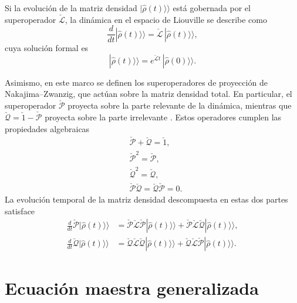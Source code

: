 Si la evolución de la matriz densidad $|\hat{\rho}(t)\rangle \rangle$ está gobernada por el superoperador $\check{\mathcal{L}}$, la dinámica en el espacio de Liouville se describe como
\begin{equation*}
    \frac{d}{dt}|\hat{\rho}(t) \rangle \rangle = \check{\mathcal{L}}\,|\hat{\rho}(t) \rangle \rangle,
\end{equation*}
cuya solución formal es
\begin{equation}
    |\hat{\rho}(t)\rangle \rangle = e^{\check{\mathcal{L}}t}\,|\hat{\rho}(0)\rangle \rangle. 
    \label{sec2liouvilleformal}
\end{equation}

Asimismo, en este marco se definen los superoperadores de proyección de Nakajima–Zwanzig, que actúan sobre la matriz densidad total. En particular, el superoperador $\check{\mathcal{P}}$ proyecta sobre la parte relevante de la dinámica, mientras que $\check{\mathcal{Q}} = \check{1} - \check{\mathcal{P}}$ proyecta sobre la parte irrelevante \cite{zwanzig1966statistical}. Estos operadores cumplen las propiedades algebraicas
\begin{align*}
    & \check{\mathcal{P}} + \check{\mathcal{Q}} = \check{1}, \\
    & \check{\mathcal{P}}^{2} = \check{\mathcal{P}}, \\
    & \check{\mathcal{Q}}^{2} = \check{\mathcal{Q}}, \\
    & \check{\mathcal{P}}\check{\mathcal{Q}} = \check{\mathcal{Q}}\check{\mathcal{P}} = 0.
\end{align*}
La evolución temporal de la matriz densidad descompuesta en estas dos partes satisface
\begin{align*}
    \frac{d}{dt}\check{\mathcal{P}}|\hat{\rho}(t)\rangle \rangle 
    &= \check{\mathcal{P}}\check{\mathcal{L}}\check{\mathcal{P}}|\hat{\rho}(t)\rangle \rangle  
     + \check{\mathcal{P}}\check{\mathcal{L}}\check{\mathcal{Q}}|\hat{\rho}(t)\rangle \rangle, \\
    \frac{d}{dt}\check{\mathcal{Q}}|\hat{\rho}(t)\rangle \rangle  
    &= \check{\mathcal{Q}}\check{\mathcal{L}}\check{\mathcal{Q}}|\hat{\rho}(t)\rangle \rangle  
     + \check{\mathcal{Q}}\check{\mathcal{L}}\check{\mathcal{P}}|\hat{\rho}(t)\rangle \rangle.
\end{align*}


\label{sec2:superop}


\section{Ecuación maestra generalizada}

